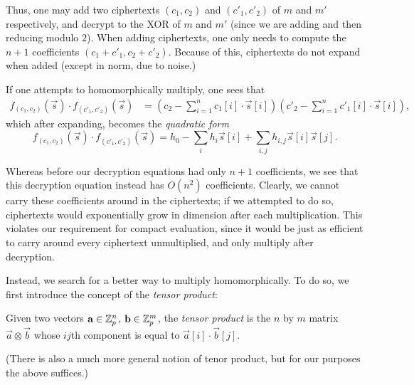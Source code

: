     Thus, one may add two ciphertexts $(c_1, c_2)$ and $(c'_1, c'_2)$ of $m$ and $m'$ respectively, and decrypt to the XOR of $m$ and $m'$ (since we are adding and then reducing modulo $2$). When adding ciphertexts, one only needs to compute the $n+1$ coefficients $(c_1 + c'_1, c_2 + c'_2)$. Because of this, ciphertexts do not expand when added (except in norm, due to noise.)

    If one attempts to homomorphically multiply, one sees that
    \begin{align*}
        f_{(c_1, c_2)}(\vec{s}) \cdot f_{(c'_1, c'_2)}(\vec{s}) &= (c_2 - \sum_{i = 1}^n c_1[i] \cdot \vec{s}[i]) (c'_2 - \sum_{i = 1}^n c'_1[i] \cdot \vec{s}[i]),
    \end{align*}
    which after expanding, becomes the \emph{quadratic form}
    \[f_{(c_1, c_2)}(\vec{s}) \cdot f_{(c'_1, c'_2)}(\vec{s}) = h_0 - \sum_i h_i \vec{s}[i] + \sum_{i,j} h_{i,j} \vec{s}[i] \vec{s}[j].\]

    Whereas before our decryption equations had only $n+1$ coefficients, we see that this decryption equation instead has $O(n^2)$ coefficients. Clearly, we cannot carry these coefficients around in the ciphertexts; if we attempted to do so, ciphertexts would exponentially grow in dimension after each multiplication. This violates our requirement for compact evaluation, since it would be just as efficient to carry around every ciphertext unmultiplied, and only multiply after decryption.

    Instead, we search for a better way to multiply homomorphically. To do so, we first introduce the concept of the \emph{tensor product}:

    \begin{definition}
        Given two vectors $\mathbf{a} \in \mathbb{Z}_p^n$, $\mathbf{b} \in \mathbb{Z}_p^m$, the \emph{tensor product} is the $n$ by $m$ matrix $\vec{a} \otimes \vec{b}$ whose $ij$th component is equal to $\vec{a}[i] \cdot \vec{b}[j]$.
    \end{definition}

    (There is also a much more general notion of tenor product, but for our purposes the above suffices.)

